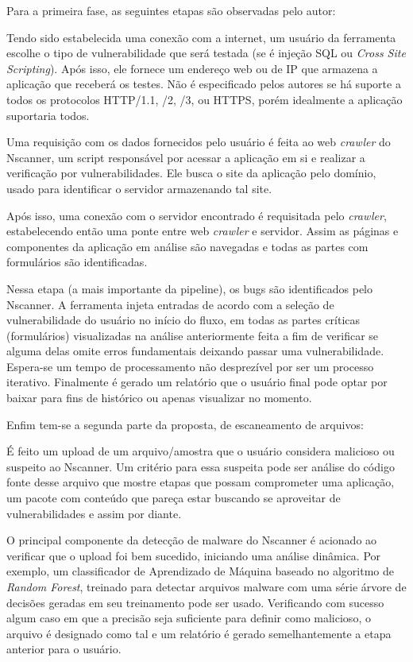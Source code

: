 Para a primeira fase, as seguintes etapas são observadas pelo autor:
\begin{alineas}
\item Tendo sido estabelecida uma conexão com a internet, um usuário da ferramenta escolhe o tipo de vulnerabilidade que será testada (se é injeção SQL ou \textit{Cross Site Scripting}). Após isso, ele fornece um endereço web ou de IP que armazena a aplicação que receberá os testes. Não é especificado pelos autores se há suporte a todos os protocolos HTTP/1.1, /2, /3, ou HTTPS, porém idealmente a aplicação suportaria todos.
\item Uma requisição com os dados fornecidos pelo usuário é feita ao web \textit{crawler} do Nscanner, um script responsável por acessar a aplicação em si e realizar a verificação por vulnerabilidades. Ele busca o site da aplicação pelo domínio, usado para identificar o servidor armazenando tal site.
\item Após isso, uma conexão com o servidor encontrado é requisitada pelo \textit{crawler}, estabelecendo então uma ponte entre web \textit{crawler} e servidor. Assim as páginas e componentes da aplicação em análise são navegadas e todas as partes com formulários são identificadas.
\item Nessa etapa (a mais importante da pipeline), os bugs são identificados pelo Nscanner. A ferramenta injeta entradas de acordo com a seleção de vulnerabilidade do usuário no início do fluxo, em todas as partes críticas (formulários) visualizadas na análise anteriormente feita a fim de verificar se alguma delas omite erros fundamentais deixando passar uma vulnerabilidade. Espera-se um tempo de processamento não desprezível por ser um processo iterativo. Finalmente é gerado um relatório que o usuário final pode optar por baixar para fins de histórico ou apenas visualizar no momento.
\end{alineas}

Enfim tem-se a segunda parte da proposta, de escaneamento de arquivos:
\begin{alineas}
\item É feito um upload de um arquivo/amostra que o usuário considera malicioso ou suspeito ao Nscanner. Um critério para essa suspeita pode ser análise do código fonte desse arquivo que mostre etapas que possam comprometer uma aplicação, um pacote com conteúdo que pareça estar buscando se aproveitar de vulnerabilidades e assim por diante. 
\item O principal componente da detecção de malware do Nscanner é acionado ao verificar que o upload foi bem sucedido, iniciando uma análise dinâmica. Por exemplo, um classificador de Aprendizado de Máquina baseado no algoritmo de \textit{Random Forest}, treinado para detectar arquivos malware com uma série árvore de decisões geradas em seu treinamento pode ser usado. Verificando com sucesso algum caso em que a precisão seja suficiente para definir como malicioso, o arquivo é designado como tal e um relatório é gerado semelhantemente a etapa anterior para o usuário.
\end{alineas}


